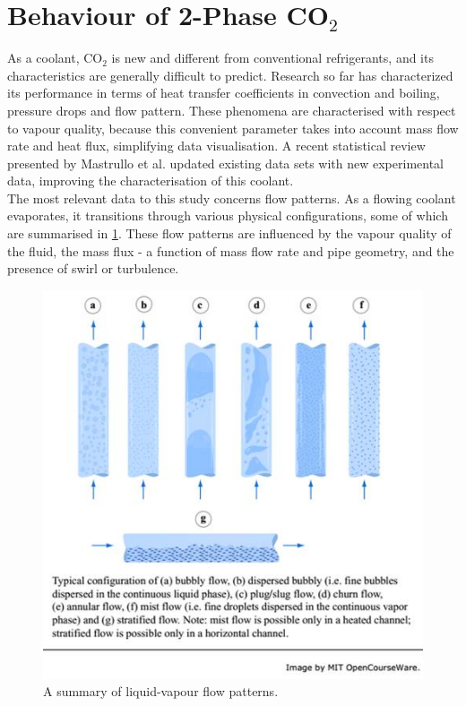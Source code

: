 \documentclass{report}
\begin{document}
\section{Behaviour of 2-Phase CO$_2$} \label{behaviour}
As a coolant, CO$_2$ is new and different from conventional refrigerants, and its characteristics are generally difficult to predict. Research so far has characterized its performance in terms of heat transfer coefficients in convection and boiling, pressure drops and flow pattern. These phenomena are characterised with respect to vapour quality, because this convenient parameter takes into account mass flow rate and heat flux, simplifying data visualisation. A recent statistical review presented by Mastrullo et al. updated existing data sets with new experimental data, improving the characterisation of this coolant. \cite{Mastrullo 2010}\\
The most relevant data to this study concerns flow patterns. As a flowing coolant evaporates, it transitions through various physical configurations, some of which are summarised in \ref{fig:flowPatterns}. These flow patterns are influenced by the vapour quality of the fluid, the mass flux - a function of mass flow rate and pipe geometry, and the presence of swirl or turbulence.
\begin{figure}
\includegraphics[width=\textwidth]{flowPatterns}
\caption{A summary of liquid-vapour flow patterns. \cite{MIT}}
\label{fig:flowPatterns}
\end{figure}
\end{document}
